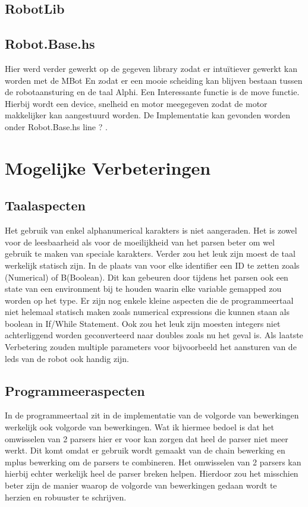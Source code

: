 \documentclass[a4paper,10pt]{article}
\begin{document}
\subsection{RobotLib}
  \subsection{Robot.Base.hs}
  Hier werd verder gewerkt op de gegeven library zodat er intuïtiever gewerkt kan worden met de MBot
  En zodat er een mooie scheiding kan blijven bestaan tussen de robotaansturing en de taal Alphi.
  Een Interessante functie is de move functie. Hierbij wordt een device, snelheid en motor meegegeven
  zodat de motor makkelijker kan aangestuurd worden.
  De Implementatie kan gevonden worden onder Robot.Base.hs line ? .

\section{Mogelijke Verbeteringen}
\subsection{Taalaspecten} 
  Het gebruik van enkel alphanumerical karakters is niet aangeraden.
  Het is zowel voor de leesbaarheid als voor de moeilijkheid van het parsen beter om wel gebruik te maken van speciale karakters.
  Verder zou het leuk zijn moest de taal werkelijk statisch zijn. In de plaats van voor elke identifier een ID te zetten zoals       (Numerical) of B(Boolean).
  Dit kan gebeuren door tijdens het parsen ook een state van een environment bij te houden waarin elke variable gemapped zou worden op het type.
  Er zijn nog enkele kleine aspecten die de programmeertaal niet helemaal statisch maken zoals numerical expressions die kunnen staan als boolean in If/While Statement.
  Ook zou het leuk zijn moesten integers niet achterliggend worden geconverteerd naar doubles zoals nu het geval is.
  Als laatste Verbetering zouden multiple parameters voor bijvoorbeeld het aansturen van de leds van de robot ook handig zijn.

\subsection{Programmeeraspecten} 
In de programmeertaal zit in de implementatie van de volgorde van bewerkingen werkelijk ook volgorde van bewerkingen.
Wat ik hiermee bedoel is dat het omwisselen van 2 parsers hier er voor kan zorgen dat heel de parser niet meer werkt.
Dit komt omdat er gebruik wordt gemaakt van de chain bewerking en mplus bewerking om de parsers te combineren. Het omwisselen van 2  parsers kan hierbij echter werkelijk heel de parser breken helpen. Hierdoor zou het misschien beter zijn de manier waarop de volgorde van bewerkingen gedaan wordt te herzien en robuuster te schrijven.
\end{document}
